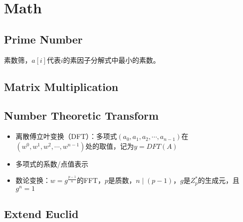\section{Math}
	\subsection{Prime Number}
		\begin{flushleft}
			素数筛，$a[i]$代表$i$的素因子分解式中最小的素数。
		\end{flushleft}
		
	\subsection{Matrix Multiplication}
		
	\subsection{Number Theoretic Transform}
		\begin{itemize}
			\item
			离散傅立叶变换（DFT）：多项式$(a_0, a_1, a_2,\cdots,a_{n-1})$在$(w^0, w^1,w^2,\cdots,w^{n-1})$处的取值，记为$y=DFT(A)$
			\item
			多项式的系数/点值表示
			\item
			数论变换：$w=g^{\frac{p-1}{n}}$的FFT，$p$是质数，$n\mid(p-1)$，$g$是$Z_p^*$的生成元，且$g^n=1$
		\end{itemize}
		
	\subsection{Extend Euclid}
		